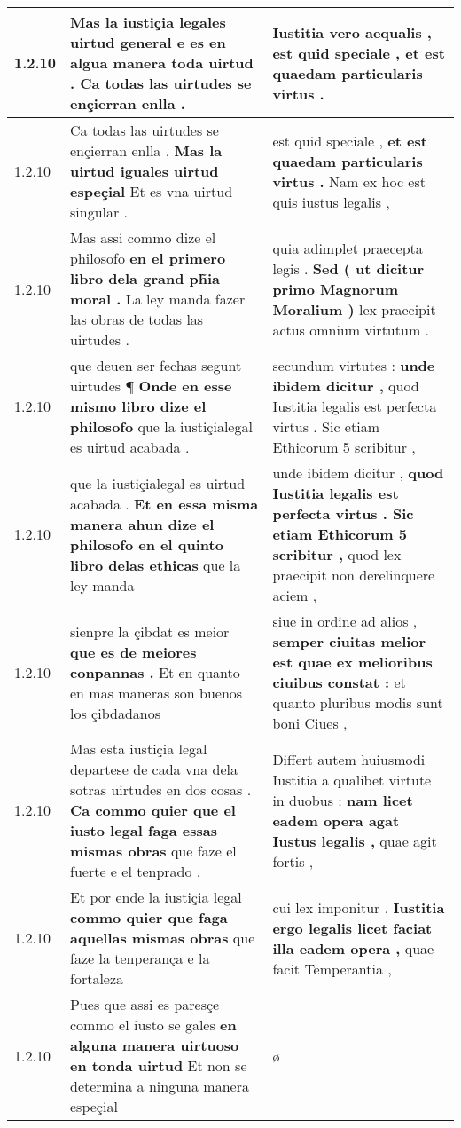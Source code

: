 \begin{tabular}{|p{1cm}|p{6.5cm}|p{6.5cm}|}
1.2.10 & Mas la iustiçia legales uirtud general \textbf{ e es en algua manera toda uirtud . } Ca todas las uirtudes se ençierran enlla . & Iustitia vero aequalis , \textbf{ est quid speciale , } et est quaedam particularis virtus . \\\hline
1.2.10 & Ca todas las uirtudes se ençierran enlla . \textbf{ Mas la uirtud iguales uirtud espeçial } Et es vna uirtud singular . & est quid speciale , \textbf{ et est quaedam particularis virtus . } Nam ex hoc est quis iustus legalis , \\\hline
1.2.10 & Mas assi commo dize el philosofo \textbf{ en el primero libro dela grand ph̃ia moral . } La ley manda fazer las obras de todas las uirtudes . & quia adimplet praecepta legis . \textbf{ Sed ( ut dicitur primo Magnorum Moralium ) } lex praecipit actus omnium virtutum . \\\hline
1.2.10 & que deuen ser fechas segunt uirtudes ¶ \textbf{ Onde en esse mismo libro dize el philosofo } que la iustiçialegal es uirtud acabada . & secundum virtutes : \textbf{ unde ibidem dicitur , } quod Iustitia legalis est perfecta virtus . Sic etiam Ethicorum 5 scribitur , \\\hline
1.2.10 & que la iustiçialegal es uirtud acabada . \textbf{ Et en essa misma manera ahun dize el philosofo en el quinto libro delas ethicas } que la ley manda & unde ibidem dicitur , \textbf{ quod Iustitia legalis est perfecta virtus . Sic etiam Ethicorum 5 scribitur , } quod lex praecipit non derelinquere aciem , \\\hline
1.2.10 & sienpre la çibdat es meior \textbf{ que es de meiores conpannas . } Et en quanto en mas maneras son buenos los çibdadanos & siue in ordine ad alios , \textbf{ semper ciuitas melior est quae ex melioribus ciuibus constat : } et quanto pluribus modis sunt boni Ciues , \\\hline
1.2.10 & Mas esta iustiçia legal departese de cada vna dela sotras uirtudes en dos cosas . \textbf{ Ca commo quier que el iusto legal faga essas mismas obras } que faze el fuerte e el tenprado . & Differt autem huiusmodi Iustitia a qualibet virtute in duobus : \textbf{ nam licet eadem opera agat Iustus legalis , } quae agit fortis , \\\hline
1.2.10 & Et por ende la iustiçia legal \textbf{ commo quier que faga aquellas mismas obras } que faze la tenperança e la fortaleza & cui lex imponitur . \textbf{ Iustitia ergo legalis licet faciat illa eadem opera , } quae facit Temperantia , \\\hline
1.2.10 & Pues que assi es paresçe commo el iusto se gales \textbf{ en alguna manera uirtuoso en tonda uirtud } Et non se determina a ninguna manera espeçial & ø \\\hline

\end{tabular}
